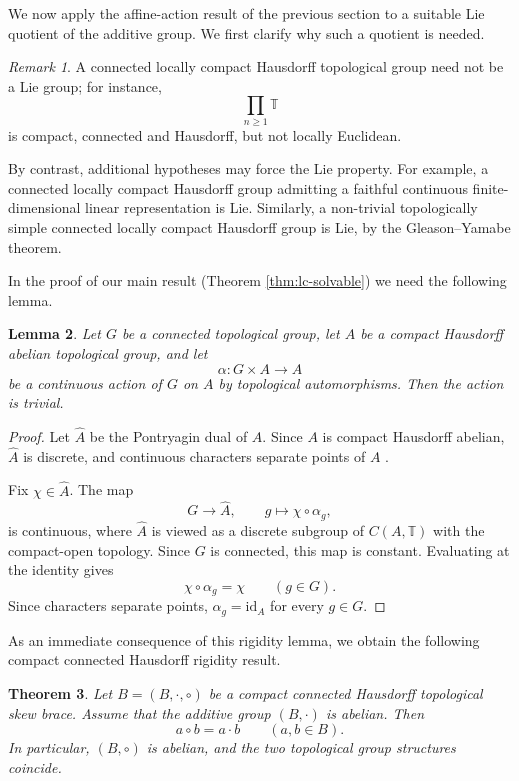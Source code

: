 \documentclass[reqno]{amsart}
\numberwithin{equation}{section}
\newtheorem{theorem}{Theorem}[section]
\newtheorem{lemma}[theorem]{Lemma}
\theoremstyle{definition}
\theoremstyle{remark}
\newtheorem{remark}[theorem]{Remark}
\newcommand{\T}{\mathbb T}
\newcommand{\id}{\mathrm{id}}
\begin{document}
We now apply the affine-action result of the previous section to a suitable
Lie quotient of the additive group. We first clarify why such a quotient is
needed.

\begin{remark}
A connected locally compact Hausdorff topological group need not be a Lie
group; for instance,
\[
\prod_{n\ge 1}\mathbb T
\]
is compact, connected and Hausdorff, but not locally Euclidean.

By contrast, additional hypotheses may force the Lie property. For example,
a connected locally compact Hausdorff group admitting a faithful continuous
finite-dimensional linear representation is Lie. Similarly, a non-trivial
topologically simple connected locally compact Hausdorff group is Lie, by the
Gleason--Yamabe theorem.
\end{remark}

In the proof of our main result (Theorem  \ref{thm:lc-solvable})
we need the following lemma.

\begin{lemma}\label{lem:pontryagin-rigidity}
Let $G$ be a connected topological group, let $A$ be a compact Hausdorff
abelian topological group, and let
\[
\alpha\colon G\times A\longrightarrow A
\]
be a continuous action of $G$ on $A$ by topological automorphisms. Then the
action is trivial.
\end{lemma}

\begin{proof}
Let $\widehat A$ be the Pontryagin dual of $A$. Since $A$ is compact Hausdorff
abelian, $\widehat A$ is discrete, and continuous characters separate points of
$A$ \cite[Chapter~I]{MorrisCompactGroups}.

Fix $\chi\in\widehat A$. The map
\[
G\longrightarrow \widehat A,
\qquad
g\longmapsto \chi\circ \alpha_g,
\]
is continuous, where $\widehat A$ is viewed as a discrete subgroup of
$C(A,\T)$ with the compact-open topology. Since $G$ is connected, this map is
constant. Evaluating at the identity gives
\[
\chi\circ \alpha_g=\chi
\qquad
(g\in G).
\]
Since characters separate points, $\alpha_g=\id_A$ for every $g\in G$.
\end{proof}


As an immediate consequence of this rigidity lemma, we obtain the following
compact connected Hausdorff rigidity result.

\begin{theorem}\label{thm:compact-rigidity}
Let $B=(B,\cdot,\circ)$ be a compact connected Hausdorff topological skew brace.
Assume that the additive group $(B,\cdot)$ is abelian. Then
\[
a\circ b=a\cdot b
\qquad
(a,b\in B).
\]
In particular, $(B,\circ)$ is abelian, and the two topological group structures
coincide.
\end{theorem}
\end{document}
